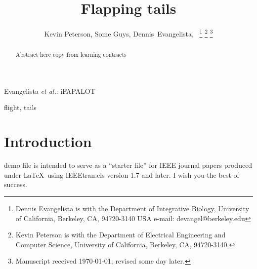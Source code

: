 \documentclass[journal]{IEEEtran}
\begin{document}
\title{Flapping tails}

\author{Kevin Peterson,
		Some Guys,
	    Dennis~Evangelista,~
\thanks{Dennis Evangelista is with the Department
of Integrative Biology, University of California, Berkeley, CA, 94720-3140 USA e-mail: devangel@berkeley.edu}%
\thanks{Kevin Peterson is with the Department of Electrical Engineering and Computer Science, University of California, Berkeley, CA, 94720-3140.}%
\thanks{Manuscript received \today; revised some day later.}}

%
{Evangelista \MakeLowercase{\textit{et al.}}: iFAPALOT}





\maketitle

\begin{abstract}
Abstract here copy from learning contracts
\end{abstract}

\begin{IEEEkeywords}
flight, tails
\end{IEEEkeywords}

\IEEEpeerreviewmaketitle



\section{Introduction}
% 
% 
% 
% 
 demo file is intended to serve as a ``starter file''
for IEEE journal papers produced under \LaTeX\ using
IEEEtran.cls version 1.7 and later.
I wish you the best of success.
\end{document}
